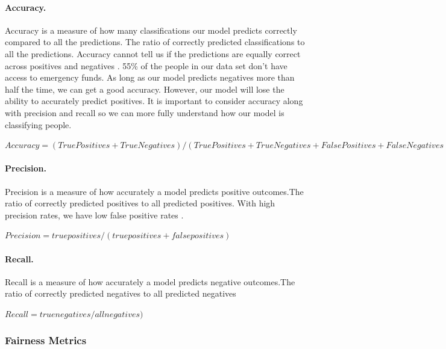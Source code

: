 \documentclass[water,article,submit,moreauthors,pdftex]{mdpi}
\begin{document}
\hypertarget{accuracy.}{%
\paragraph{Accuracy.}\label{accuracy.}}

Accuracy is a measure of how many classifications our model predicts
correctly compared to all the predictions. The ratio of correctly
predicted classifications to all the predictions. Accuracy cannot tell
us if the predictions are equally correct across positives and negatives
\citep{juba2019precision, gupta2021recall}. 55\% of the people in our
data set don't have access to emergency funds. As long as our model
predicts negatives more than half the time, we can get a good accuracy.
However, our model will lose the ability to accurately predict
positives. It is important to consider accuracy along with precision and
recall so we can more fully understand how our model is classifying
people.

\(Accuracy = (True Positives + True Negatives) / (True Positives + True Negatives + False Positives + False Negatives)\)

\hypertarget{precision.}{%
\paragraph{Precision.}\label{precision.}}

Precision is a measure of how accurately a model predicts positive
outcomes.The ratio of correctly predicted positives to all predicted
positives. With high precision rates, we have low false positive rates
\citep{juba2019precision, gupta2021recall}.

\(Precision = true positives / (true positives + false positives)\)

\hypertarget{recall.}{%
\paragraph{Recall.}\label{recall.}}

Recall is a measure of how accurately a model predicts negative
outcomes.The ratio of correctly predicted negatives to all predicted
negatives\citep{gupta2021recall}

\(Recall = true negatives / all negatives)\)

\hypertarget{fairness-metrics}{%
\subsubsection{Fairness Metrics}\label{fairness-metrics}}
\end{document}
